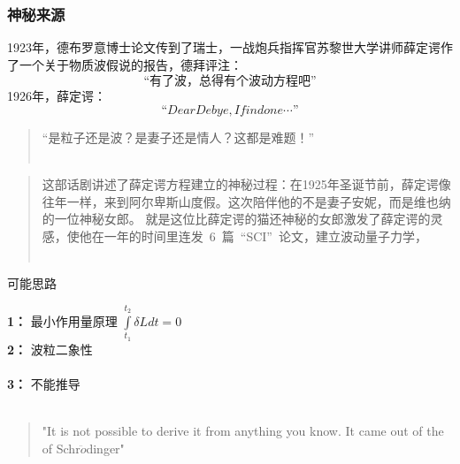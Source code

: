 \begin{frame}
    \frametitle{神秘来源}
    \begin{itemize}
        \Item 1923年，德布罗意博士论文传到了瑞士，一战炮兵指挥官苏黎世大学讲师薛定谔作了一个关于物质波假说的报告，德拜评注：\\
        $$\text{“有了波，总得有个波动方程吧”}$$
        \Item 1926年，薛定谔：
        $$“Dear Debye, I find one \cdots”$$
    \end{itemize}            
\end{frame}

\begin{frame}
    \begin{alertblock} {}  
    \begin{quote}
        “是粒子还是波？是妻子还是情人？这都是难题！” \\
        ~~\\
    \end{quote}  
    \begin{quote}    
    这部话剧讲述了薛定谔方程建立的神秘过程：在1925年圣诞节前，薛定谔像往年一样，来到阿尔卑斯山度假。这次陪伴他的不是妻子安妮，而是维也纳的一位神秘女郎。
    就是这位比薛定谔的猫还神秘的女郎激发了薛定谔的灵感，使他在一年的时间里连发~6~篇~“SCI”~论文，建立波动量子力学，\ddots\\
    ~~\\
    \end{quote} 
    \end{alertblock}   
\end{frame}

\begin{frame}
	\begin{alertblock} {可能思路}  
		\begin{itemize}
			\Item 	\textbf{1：}  最小作用量原理 $\int\limits_{t_1}^{t_2} \delta L d t =0 $\\ 
			\Item 	\textbf{2：}  波粒二象性\\ 
			~\\ 
			\Item 	\textbf{3：}  不能推导\\
            ~\\ 
            \begin{quote}
            "It is not possible to derive it from anything you know. It came out of the \alert{\faHeartbeat} of Schr$\ddot{o}$dinger"\\
            \end{quote}
		\end{itemize}
	\end{alertblock}
\end{frame}

